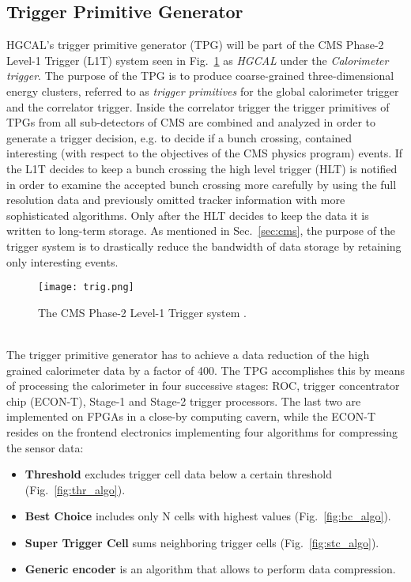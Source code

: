 \documentclass[../../main.tex]{subfiles}
\begin{document}
\subsection{Trigger Primitive Generator}\label{subsec:tpg}
HGCAL's trigger primitive generator (TPG) will be part of the CMS Phase-2 Level-1 Trigger (L1T) system seen in Fig.~\ref{fig:trg} as \textit{HGCAL} under the \textit{Calorimeter trigger}. The purpose of the TPG is to produce coarse-grained three-dimensional energy clusters, referred to as \textit{trigger primitives} for the global calorimeter trigger and the correlator trigger. Inside the correlator trigger the trigger primitives of TPGs from all sub-detectors of CMS are combined and analyzed in order to generate a trigger decision, e.g. to decide if a bunch crossing, contained interesting (with respect to the objectives of the CMS physics program) events. If the L1T decides to keep a bunch crossing the high level trigger (HLT) is notified in order to examine the accepted bunch crossing more carefully by using the full resolution data and previously omitted tracker information with more sophisticated algorithms. Only after the HLT decides to keep the data it is written to long-term storage. As mentioned in Sec.\ \ref{sec:cms}, the purpose of the trigger system is to drastically reduce the bandwidth of data storage by retaining only interesting events.\\
\begin{figure}[htp]
	\begin{center}
		\texttt{[image: trig.png]}
		\caption{The CMS Phase-2 Level-1 Trigger system \cite{tdr_hgcal}.}
		\label{fig:trg}
	\end{center}
\end{figure}
\\
The trigger primitive generator has to achieve a data reduction of the high grained calorimeter data by a factor of 400. The TPG accomplishes this by means of processing the calorimeter in four successive stages: ROC, trigger concentrator chip (ECON-T), Stage-1 and Stage-2 trigger processors. The last two are implemented on FPGAs in a close-by computing cavern, while the ECON-T resides on the frontend electronics implementing four algorithms for compressing the sensor data:
\begin{itemize}
	\item \textbf{Threshold} excludes trigger cell data below a certain threshold (Fig.~\ref{fig:thr_algo}).
	\item \textbf{Best Choice} includes only N cells with highest values (Fig.~\ref{fig:bc_algo}).
	\item \textbf{Super Trigger Cell} sums neighboring trigger cells (Fig.~\ref{fig:stc_algo}).
	\item \textbf{Generic encoder} is an algorithm that allows to perform data compression.
\end{itemize}
\end{document}

